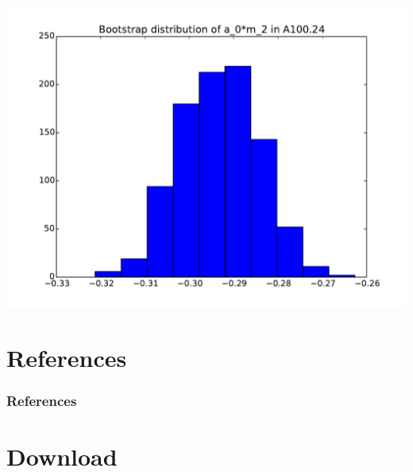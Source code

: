 \documentclass[english, fleqn]{beamer}
\begin{document}
\begin{frame}
    \begin{centering}
        \includegraphics[height=\textheight]{plots/A100_24_L24_T48_beta190_mul0100_musig150_mudel190_kappa1632550__ev120__TB2_SO_LI6_new_boot-hist_a_0*m_2.pdf}
    \end{centering}
\end{frame}



















\section*{References}

\begin{frame}
    \frametitle{References}

    \printbibliography
\end{frame}

\section*{Download}
\end{document}
